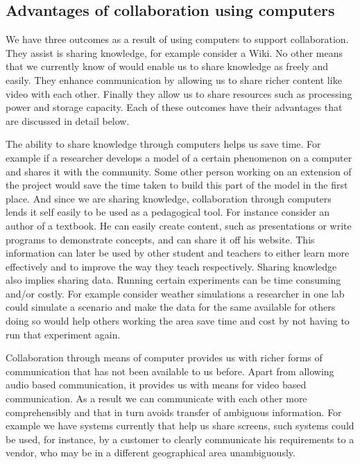 \subsection{Advantages of collaboration using computers}
We have three outcomes as a result of using computers to support
collaboration. They assist is sharing knowledge, for example consider
a Wiki. No other means that we currently know of would enable us to
share knowledge as freely and easily. They enhance communication
by allowing us to share richer content like video with each
other. Finally they allow us to share resources such as processing
power and storage capacity. Each of these outcomes have their
advantages that are discussed in detail below.

The ability to share knowledge through computers helps us save
time. For example if a researcher develops a model of a certain
phenomenon on a computer and shares it with the community. Some other
person working on an extension of the project would save the time
taken to build this part of the model in the first place. And since we
are sharing knowledge, collaboration through computers lends it self
easily to be used as a pedagogical tool. For instance consider an
author of a textbook. He can easily create content, such as
presentations or write programs to demonstrate concepts, and can share
it off his website. This information can later be used by other
student and teachers to either learn more effectively and to improve
the way they teach respectively. Sharing knowledge also implies
sharing data. Running certain experiments can be time consuming and/or
costly. For example consider weather simulations a researcher in one
lab could simulate a scenario and make the data for the same available
for others doing so would help others working the area save time and
cost by not having to run that experiment again.

Collaboration through means of computer provides us with richer forms
of communication that has not been available to us before. Apart from
allowing audio based communication, it provides us with means for
video based communication. As a result we can communicate with each
other more comprehensibly and that in turn avoids transfer of
ambiguous information. For example we have systems currently that help
us share screens, such systems could be used, for instance, by a
customer to clearly communicate his requirements to a vendor, who may
be in a different geographical area unambiguously. 

